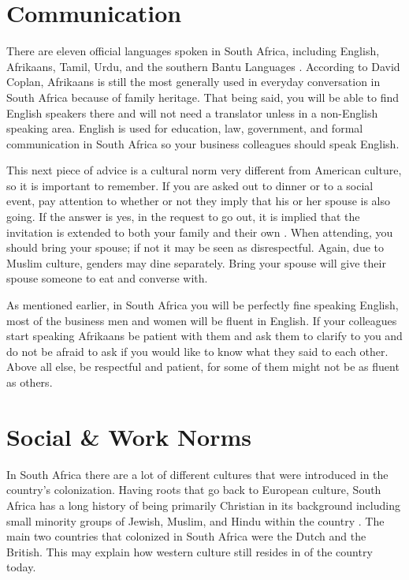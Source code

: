 \documentclass[11pt,a4paper,twoside]{report}
\begin{document}
\section{Communication}

There are eleven official languages spoken in South Africa, including English,
Afrikaans, Tamil, Urdu, and the southern Bantu Languages \citep*{coplan}.
According to David Coplan, Afrikaans is still the most generally used in
everyday conversation in South Africa because of family heritage. That being
said, you will be able to find English speakers there and will not need a
translator unless in a non-English speaking area. English is used for
education, law, government, and formal communication in South Africa so your
business colleagues should speak English.


This next piece of advice is a cultural norm very different from American
culture, so it is important to remember. If you are asked out to dinner or to a
social event, pay attention to whether or not they imply that his or her spouse
is also going. If the answer is yes, in the request to go out, it is implied
that the invitation is extended to both your family and their own
\citep*{coplan}. When attending, you should bring your spouse; if not it may be
seen as disrespectful. Again, due to Muslim culture, genders may dine
separately. Bring your spouse will give their spouse someone to eat and
converse with.

As mentioned earlier, in South Africa you will be perfectly fine speaking
English, most of the business men and women will be fluent in English. If your
colleagues start speaking Afrikaans be patient with them and ask them to
clarify to you and do not be afraid to ask if you would like to know what they
said to each other. Above all else, be respectful and patient, for some of them
might not be as fluent as others.

\section{Social \& Work Norms}

In South Africa there are a lot of different cultures that were introduced in
the country’s colonization. Having roots that go back to European culture,
South Africa has a long history of being primarily Christian in its background
including small minority groups of Jewish, Muslim, and Hindu within the country
\citep*{coplan}. The main two countries that colonized in South Africa were the
Dutch and the British. This may explain how western culture still resides in of
the country today.
\end{document}
